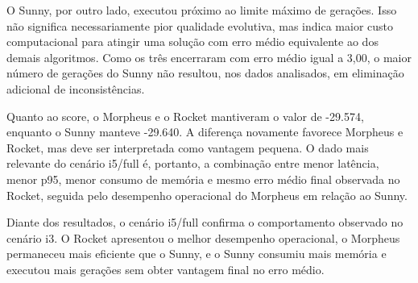O Sunny, por outro lado, executou próximo ao limite máximo de gerações. Isso não significa necessariamente pior qualidade evolutiva, mas indica maior custo computacional para atingir uma solução com erro médio equivalente ao dos demais algoritmos. Como os três encerraram com erro médio igual a 3,00, o maior número de gerações do Sunny não resultou, nos dados analisados, em eliminação adicional de inconsistências.

Quanto ao score, o Morpheus e o Rocket mantiveram o valor de -29.574, enquanto o Sunny manteve -29.640. A diferença novamente favorece Morpheus e Rocket, mas deve ser interpretada como vantagem pequena. O dado mais relevante do cenário i5/full é, portanto, a combinação entre menor latência, menor p95, menor consumo de memória e mesmo erro médio final observada no Rocket, seguida pelo desempenho operacional do Morpheus em relação ao Sunny.

Diante dos resultados, o cenário i5/full confirma o comportamento observado no cenário i3. O Rocket apresentou o melhor desempenho operacional, o Morpheus permaneceu mais eficiente que o Sunny, e o Sunny consumiu mais memória e executou mais gerações sem obter vantagem final no erro médio.
